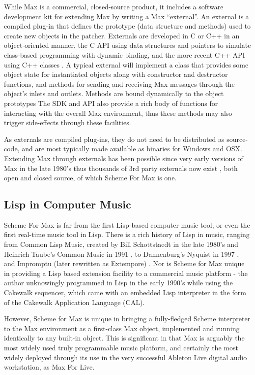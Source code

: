\documentclass[acmsmall]{acmart}
\begin{document}
While Max is a commercial, closed-source product, it includes a software development kit for 
extending Max by writing a Max “external”. An external is a compiled plug-in that defines the  
prototype (data structure and methods) used to create new objects in the patcher.  
Externals are developed in C or C++ in an object-oriented manner, the C API using data 
structures and pointers to simulate class-based programming with dynamic binding,
and the more recent C++ API using C++ classes \cite{Zicarelli2002}.
A typical external will implement a class that provides some object state for instantiated
objects along with constructor and destructor functions, and  
methods for sending and receiving Max messages through the object’s inlets and outlets.
Methods are bound dynamically to the object prototypes
The SDK and API also provide a rich body of functions for interacting with the overall Max
environment, thus these methods may also trigger side-effects through these facilities.

As externals are compiled plug-ins, they do not need to be distributed as source-code, and
are most typically made available as binaries for Windows and OSX. Extending Max through externals has 
been possible since very early versions of Max in the late 1980's
thus thousands of 3rd party externals 
now exist \cite{MaxObjects2021}, both open and closed source, of which Scheme For Max is one.


\subsection{Lisp in Computer Music}

Scheme For Max is far from the first Lisp-based computer music tool, or even
the first real-time music tool in Lisp. There is a rich history of Lisp in music, 
ranging from Common Lisp Music, created by Bill Schottstaedt in the late 1980's
\cite{Wang17} and Heinrich Taube's Common Music in 1991 \cite{Taube91},
to Dannenburg's Nyquist in 1997 \cite{Dannenberg97},
and Impromptu (later rewritten as Extempore) \cite{Sorensen2010}. 
Nor is Scheme for Max unique in providing a Lisp
based extension facility to a commercial music platform - the author unknowingly
programmed in Lisp in the early 1990's while using the Cakewalk sequencer,
which came with an embedded Lisp interpreter in the form of the 
Cakewalk Application Language (CAL).

However, Scheme for Max is unique in bringing a fully-fledged Scheme interpreter
to the Max environment as a first-class Max object, implemented and running
identically to any built-in object. This is significant in that Max
is arguably the most widely used truly programmable
music platform, and certainly the most widely deployed through its use in 
the very successful Ableton Live digital audio workstation, as Max For Live.
\end{document}
